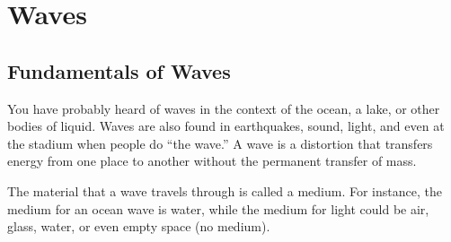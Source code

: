 \chapter{Waves}
	\section{Fundamentals of Waves} 

	You have probably heard of waves in the context of the ocean, a lake, or other bodies of liquid.  Waves are also found in earthquakes, sound, light, and even at the stadium when people do ``the wave.''  A \gls{wave} is a distortion that transfers energy from one place to another without the permanent transfer of mass. 
	
	The material that a wave travels through is called a \gls{medium}.   For instance, the medium for an ocean wave is water, while the medium for light could be air, glass, water, or even empty space (no medium).  

